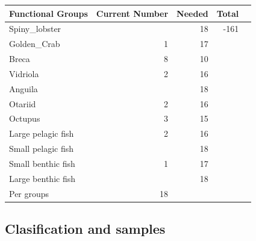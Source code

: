 \documentclass[11pt]{article}
\begin{document}
\begin{center}
\begin{tabular}{lrrrl}
 Functional Groups   &  Current Number  &  Needed  &  Total  &     \\
\hline
 Spiny_lobster       &                  &      18  &   -161  &     \\
 Golden_Crab         &               1  &      17  &         &     \\
 Breca               &               8  &      10  &         &     \\
 Vidriola            &               2  &      16  &         &     \\
 Anguila             &                  &      18  &         &     \\
 Otariid             &               2  &      16  &         &     \\
 Octupus             &               3  &      15  &         &     \\
 Large pelagic fish  &               2  &      16  &         &     \\
 Small pelagic fish  &                  &      18  &         &     \\
 Small benthic fish  &               1  &      17  &         &     \\
 Large benthic fish  &                  &      18  &         &     \\
\hline
 Per groups          &              18  &          &         &     \\
\end{tabular}
\end{center}
\subsection*{Clasification and samples}
\label{sec-7-4}
\end{document}
